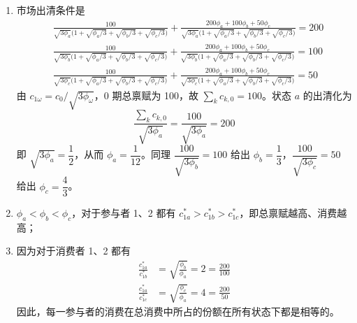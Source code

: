 \begin{solution}
\begin{enumerate}[label=(\alph*)]
\[\begin{aligned}
            c_{1b}^{*}&=\frac{200\phi_{a}+100\phi_{b}+50\phi_{c}}{\sqrt{3\phi_{b}}\bigl(1+\sqrt{\phi_{a}/3}+\sqrt{\phi_{b}/3}+\sqrt{\phi_{c}/3}\bigr)}\\
            c_{1c}^{*}&=\frac{200\phi_{a}+100\phi_{b}+50\phi_{c}}{\sqrt{3\phi_{c}}\bigl(1+\sqrt{\phi_{a}/3}+\sqrt{\phi_{b}/3}+\sqrt{\phi_{c}/3}\bigr)}
        \end{aligned}
    \]
    因为最优消费都是非负的，因而上面的求解过程是没有问题的；
    \item 市场出清条件是
    \[
        \begin{aligned}
            &\frac{100}{\sqrt{3\phi_{a}}\bigl(1+\sqrt{\phi_{a}/3}+\sqrt{\phi_{b}/3}+\sqrt{\phi_{c}/3}\bigr)}+\frac{200\phi_{a}+100\phi_{b}+50\phi_{c}}{\sqrt{3\phi_{a}}\bigl(1+\sqrt{\phi_{a}/3}+\sqrt{\phi_{b}/3}+\sqrt{\phi_{c}/3}\bigr)}=200\\
            &\frac{100}{\sqrt{3\phi_{b}}\bigl(1+\sqrt{\phi_{a}/3}+\sqrt{\phi_{b}/3}+\sqrt{\phi_{c}/3}\bigr)}+\frac{200\phi_{a}+100\phi_{b}+50\phi_{c}}{\sqrt{3\phi_{b}}\bigl(1+\sqrt{\phi_{a}/3}+\sqrt{\phi_{b}/3}+\sqrt{\phi_{c}/3}\bigr)}=100\\
            &\frac{100}{\sqrt{3\phi_{c}}\bigl(1+\sqrt{\phi_{a}/3}+\sqrt{\phi_{b}/3}+\sqrt{\phi_{c}/3}\bigr)}+\frac{200\phi_{a}+100\phi_{b}+50\phi_{c}}{\sqrt{3\phi_{c}}\bigl(1+\sqrt{\phi_{a}/3}+\sqrt{\phi_{b}/3}+\sqrt{\phi_{c}/3}\bigr)}=50
        \end{aligned}
    \]
    由 $c_{1\omega}=c_{0}/\sqrt{3\phi_{\omega}}$，0 期总禀赋为 100，故 $\sum_{k}c_{k,0}=100$。状态 $a$ 的出清化为
    \[
        \frac{\sum_{k}c_{k,0}}{\sqrt{3\phi_{a}}}=\frac{100}{\sqrt{3\phi_{a}}}=200
    \]
    即 $\sqrt{3\phi_{a}}=\dfrac12$，从而 $\phi_{a}=\dfrac{1}{12}$。同理 $\dfrac{100}{\sqrt{3\phi_{b}}}=100$ 给出 $\phi_{b}=\dfrac13$，$\dfrac{100}{\sqrt{3\phi_{c}}}=50$ 给出 $\phi_{c}=\dfrac43$。
    \item $\phi_{a}<\phi_{b}<\phi_{c}$，对于参与者 1、2 都有 $c_{1a}^{*}>c_{1b}^{*}>c_{1c}^{*}$，即总禀赋越高、消费越高；
    \item 因为对于消费者 1、2 都有
    \[
        \begin{aligned}
            \frac{c_{1a}^{*}}{c_{1b}^{*}}&=\sqrt{\frac{\phi_{b}}{\phi_{a}}}=2=\frac{200}{100}\\
            \frac{c_{1a}^{*}}{c_{1c}^{*}}&=\sqrt{\frac{\phi_{c}}{\phi_{a}}}=4=\frac{200}{50}
        \end{aligned}
    \]
    因此，每一参与者的消费在总消费中所占的份额在所有状态下都是相等的。
\end{enumerate}
\end{solution}

